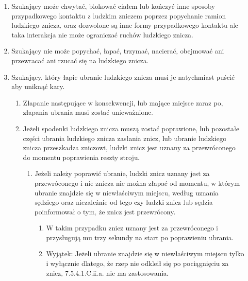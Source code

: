 \documentclass[12pt]{article}
\begin{document}
\begin{enumerate}
	\item
	      Szukający może chwytać, blokować ciałem lub kończyć inne sposoby
	      przypadkowego kontaktu z ludzkim zniczem poprzez popychanie ramion
	      ludzkiego znicza, oraz dozwolone są inne formy przypadkowego kontaktu
	      ale taka interakcja nie może ograniczać ruchów ludzkiego znicza.
	\item
	      Szukający nie może popychać, łapać, trzymać, nacierać, obejmować ani
	      przewracać ani rzucać się na ludzkiego znicza.
	\item
	      Szukający, który łapie ubranie ludzkiego znicza musi je natychmiast
	      puścić aby uniknąć kary.

	      \begin{enumerate}
		      \item
		            Złapanie następujące w konsekwencji, lub mające miejsce zaraz po,
		            złapania ubrania musi zostać unieważnione.
		      \item
		            Jeżeli spodenki ludzkiego znicza muszą zostać poprawione, lub
		            pozostałe części ubrania ludzkiego znicza zasłania znicz, lub
		            ubranie ludzkiego znicza przeszkadza zniczowi, ludzki znicz jest
		            uznany za przewróconego do momentu poprawienia reszty stroju.

		            \begin{enumerate}
			            \item
			                  Jeżeli należy poprawić ubranie, ludzki znicz uznany jest za
			                  przewróconego i nie znicza nie można złapać od momentu, w którym
			                  ubranie znajdzie się w niewłaściwym miejscu, według uznania
			                  sędziego oraz niezależnie od tego czy ludzki znicz lub sędzia
			                  poinformował o tym, że znicz jest przewrócony.

			                  \begin{enumerate}
				                  \item
				                        W takim przypadku znicz uznany jest za przewróconego i
				                        przysługują mu trzy sekundy na start po poprawieniu ubrania.
				                  \item
				                        Wyjątek: Jeżeli ubranie znajdzie się w niewłaściwym miejscu
				                        tylko i wyłącznie dlatego, że rzep nie odkleił się po
				                        pociągnięciu za znicz, 7.5.4.1.C.ii.a. nie ma zastosowania.
			                  \end{enumerate}
		            \end{enumerate}
	      \end{enumerate}
\end{enumerate}
\end{document}
